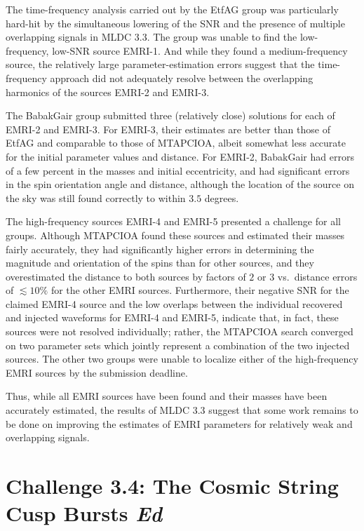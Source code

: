 \documentclass{iopart}
\begin{document}
The time-frequency analysis carried out by the EtfAG group was particularly hard-hit by the simultaneous lowering of the SNR and the presence of multiple overlapping signals in MLDC 3.3.  The group was unable to find the low-frequency, low-SNR source EMRI-1.  And while they found a medium-frequency source, the relatively large parameter-estimation errors suggest that the time-frequency approach did not adequately resolve between the overlapping harmonics of the sources EMRI-2 and EMRI-3.

The BabakGair group submitted three (relatively close) solutions for each of EMRI-2 and EMRI-3.  For EMRI-3, their estimates are better than those of EtfAG and comparable to those of MTAPCIOA, albeit somewhat less accurate for the initial parameter values and distance.  For EMRI-2, BabakGair had errors of a few percent in the masses and initial eccentricity, and had significant errors in the spin orientation angle and distance, although the location of the source on the sky was still found correctly to within $3.5$ degrees.

The high-frequency sources EMRI-4 and EMRI-5 presented a challenge for all groups.  Although MTAPCIOA found these sources and estimated their masses fairly accurately, they had significantly higher errors in determining the magnitude and orientation of the spins than for other sources, and they overestimated the distance to both sources by factors of $2$ or $3$ vs.~distance errors of $\lesssim 10\%$ for the other EMRI sources.  Furthermore, their negative SNR for the claimed EMRI-4 source and the low overlaps between the individual recovered and injected waveforms for EMRI-4 and EMRI-5, indicate that, in fact, these sources were not resolved individually; rather, the MTAPCIOA search converged on two parameter sets which jointly represent a combination of the two injected sources.   The other two groups were unable to localize either of the high-frequency EMRI sources by the submission deadline.

Thus, while all EMRI sources have been found and their masses have been accurately estimated, the results of MLDC 3.3 suggest that some work remains to be done on improving the estimates of EMRI parameters for relatively weak and overlapping signals.


\section{Challenge 3.4: The Cosmic String Cusp Bursts {\it Ed}}
\end{document}
